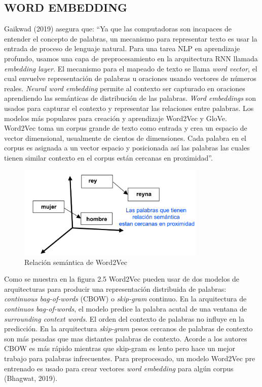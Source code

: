 \documentclass[letter, openright, 12pt]{book}
\newcommand*\setcaptioncitation[1]{\def\captioncitation{\textit{Fuente:}~#1}}
\let\captioncitation\relax
\begin{document}
\subsection{WORD EMBEDDING}
Gaikwad (2019) asegura que: “Ya que las computadoras son incapaces de entender el concepto de palabras, un mecanismo para representar texto es usar la entrada de proceso de lenguaje natural. Para una tarea NLP en aprendizaje profundo, usamos una capa de preprocesamiento en la arquitectura RNN llamada \textit{embedding layer}. El mecanismo para el mapeado de texto se llama \textit{word vector}, el cual envuelve representación de palabras u oraciones usando vectores de números reales. \textit{Neural word embedding} permite al contexto ser capturado en oraciones aprendiendo las semánticas de distribución de las palabras. \textit{Word embeddings} son usados para capturar el contexto y representar las relaciones entre palabras. Los modelos más populares para creación y aprendizaje Word2Vec y GloVe. Word2Vec toma un corpus grande de texto como entrada y crea un espacio de vector dimensional, usualmente de cientos de dimensiones. Cada palabra en el corpus es asignada a un vector espacio y posicionada así las palabras las cuales tienen similar contexto en el corpus están cercanas en proximidad”. 

\begin{figure}[H]
\includegraphics[width=0.8\textwidth]{figura2_5}
\setcaptioncitation{(Len, 2019)}
\caption{Relación semántica de Word2Vec}
\label{tab:figura2_5} 
\end{figure}

Como se muestra en la figura 2.5 Word2Vec pueden usar de dos modelos de arquitecturas para producir una representación distribuida de palabras: \textit{continuous bag-of-words} (CBOW) o \textit{skip-gram} continuo. En la arquitectura de \textit{continuos bag-of-words}, el modelo predice la palabra acutal de una ventana de \textit{surrounding context words}. El orden del contexto de palabras no influye en la predicción. En la arquitectura \textit{skip-gram} pesos cercanos de palabras de contexto son más pesadas que mas distantes palabras de contexto. Acorde a los autores CBOW es más rápido mientras que skip-gram es lento pero hace un mejor trabajo para palabras infrecuentes. Para preprocesado, un modelo Word2Vec pre entrenado es usado para crear vectores \textit{word embedding} para algún corpus (Bhagwat, 2019).
\end{document}
